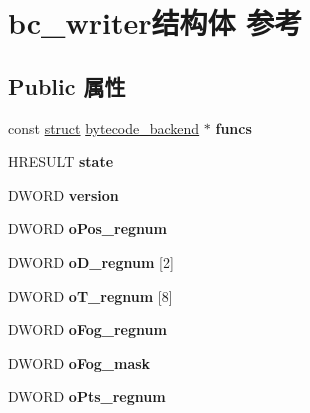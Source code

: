 \hypertarget{structbc__writer}{}\section{bc\+\_\+writer结构体 参考}
\label{structbc__writer}
\subsection*{Public 属性}
\begin{DoxyCompactItemize}
\item 
\mbox{\label{structbc__writer_ae103c590ac759b9cc6889a9f041874b6}} 
const \hyperlink{interfacestruct}{struct} \hyperlink{structbytecode__backend}{bytecode\+\_\+backend} $\ast$ {\bfseries funcs}
\item 
\mbox{\label{structbc__writer_aefa64838208f6d7ccf03bf2addbf416c}} 
H\+R\+E\+S\+U\+LT {\bfseries state}
\item 
\mbox{\label{structbc__writer_a622106df8319ec1726a6eecec7a00ba7}} 
D\+W\+O\+RD {\bfseries version}
\item 
\mbox{\label{structbc__writer_af41c68d6473d8ff35a1d7499d2e21565}} 
D\+W\+O\+RD {\bfseries o\+Pos\+\_\+regnum}
\item 
\mbox{\label{structbc__writer_a4c6e38fcd4fcd861535db4954f81bf88}} 
D\+W\+O\+RD {\bfseries o\+D\+\_\+regnum} \mbox{[}2\mbox{]}
\item 
\mbox{\label{structbc__writer_af6003d59f23c2fb9a1d759a283307a28}} 
D\+W\+O\+RD {\bfseries o\+T\+\_\+regnum} \mbox{[}8\mbox{]}
\item 
\mbox{\label{structbc__writer_a06b8fc0c0d33bbbe289d2e3a97b17fe0}} 
D\+W\+O\+RD {\bfseries o\+Fog\+\_\+regnum}
\item 
\mbox{\label{structbc__writer_ad384feb16f3254348448bd127a071fd8}} 
D\+W\+O\+RD {\bfseries o\+Fog\+\_\+mask}
\item 
\mbox{\label{structbc__writer_a10437964ec4e29c7fa8d9dbf7549332c}} 
D\+W\+O\+RD {\bfseries o\+Pts\+\_\+regnum}

\end{DoxyCompactItemize}
